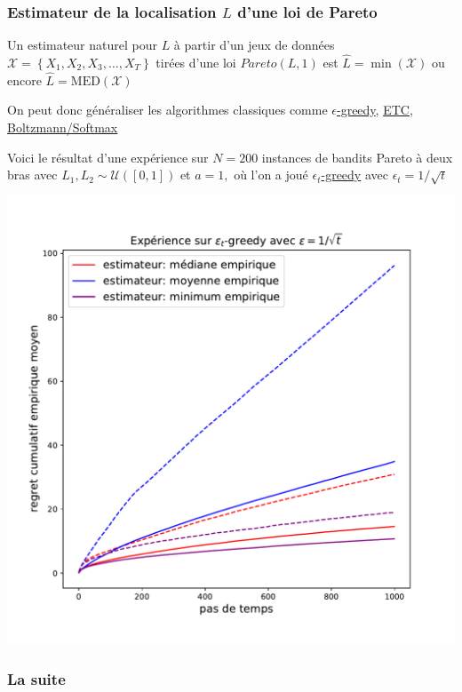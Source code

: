 \documentclass[8pt, sans]{beamer}
\begin{document}
\begin{frame}
\frametitle{Estimateur de la localisation $L$ d'une loi de Pareto}
Un estimateur naturel pour $L$ à partir d'un jeux de données $\mathcal{X}=\left\{X_1,X_2,X_3,\ldots,X_T\right\}$ tirées d'une loi $Pareto(L,1)$ est $\widehat{L}=\min(\mathcal{X})$ ou encore $\widehat{L}=\mathrm{MED}(\mathcal{X})$

\pause
\vfill

On peut donc généraliser les algorithmes classiques comme \underline{$\epsilon$-greedy}, \underline{ETC}, \underline{Boltzmann/Softmax}
  
\pause
\vfill

Voici le résultat d'une expérience sur $N=200$ instances de bandits Pareto à deux bras avec $L_1, L_2\sim\mathcal{U}([0,1])$ et $a=1,$ où l'on a joué \underline{$\epsilon_t$-greedy} avec $\epsilon_t=1/\sqrt{t}$

\vfill

\begin{center}
\includegraphics[scale=0.3]{exp-Pareto.pdf}
\end{center}

\end{frame}
                          
\begin{frame}
\frametitle{La suite}


\end{frame}
\end{document}
